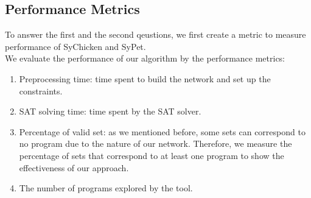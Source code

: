 \documentclass[twocolumn]{article}
\begin{document}
\subsection{Performance Metrics}
To answer the first and the second qeustions, we first create a metric to measure performance of SyChicken and SyPet.\\
We evaluate the performance of our algorithm by the performance metrics:
\begin{enumerate}
    \item Preprocessing time: time spent to build the network and set up the constraints.
    \item SAT solving time: time spent by the SAT solver.
    \item Percentage of valid set: as we mentioned before, some sets can correspond to no program due to the nature of our network. Therefore, we measure the percentage of sets that correspond to at least one program to show the effectiveness of our approach.
    \item The number of programs explored by the tool.
\end{enumerate}
\end{document}
